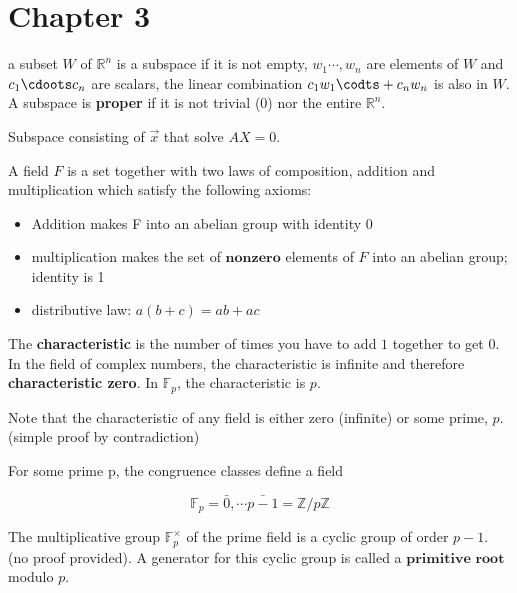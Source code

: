\section{Chapter 3}


\begin{definition}
  a subset $W$ of $\mathbb{R}^{n}$ is a subspace if it is not empty,
  $w_{1}\cdots, w_{n}$ are elements of $W$ and $c_{1}\cdoots c_{n}$ are scalars,
  the linear combination $c_{1}w_{1}\codts + c_{n}w_{n}$ is also in $W$.
  A subspace is \textbf{proper} if it is not trivial (${0}$) nor the entire
  $\mathbb{R}^{n}$.

\end{definition}

\begin{definition}
  Subspace consisting of $\vec{x}$ that solve $AX=0$.
\end{definition}

\begin{definition}
  A field $F$ is a set together with two laws of composition,
  addition and multiplication which satisfy the following axioms:
  \begin{itemize}
    \item Addition makes F into an abelian group with identity 0
    \item multiplication makes the set of $\textbf{nonzero}$ elements
      of $F$ into an abelian group; identity is 1
    \item distributive law: $a(b+c)=ab + ac$

  \end{itemize}

  The \textbf{characteristic} is the number of times you have to add $1$ together
  to get $0$. In the field of complex numbers, the characteristic is infinite
  and therefore \textbf{characteristic zero}. In $\mathbb{F}_{p}$, the
  characteristic is $p$.

  Note that the characteristic of any field is either zero (infinite) or some
  prime, $p$. (simple proof by contradiction)


\end{definition}

\begin{definition}
  For some prime p, the congruence classes define a field

  \[\mathbb{F}_{p}={\bar{0},\cdots \bar{p-1}}=\mathbb{Z}/p\mathbb{Z}\]

  The multiplicative group $\mathbb{F}_{p}^{\times}$ of the prime field is a
  cyclic group of order $p-1$. (no proof provided). A generator for this cyclic
  group is called a $\textbf{primitive root}$ modulo $p$.

\end{definition}
